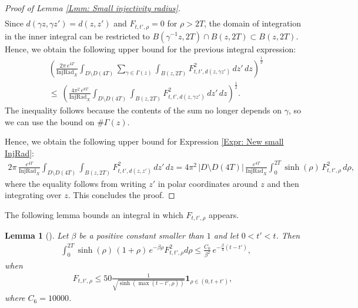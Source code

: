 \documentclass[11pt,twoside,reqno]{amsart} \usepackage{a4wide} \usepackage[T1]{fontenc} \usepackage[utf8]{inputenc} \usepackage{soul}  \usepackage{amsmath} \usepackage{amsfonts} \usepackage{amssymb} \usepackage{mathtools} \usepackage{amsthm} \usepackage{xcolor} \usepackage{graphicx} \usepackage{hyperref} \usepackage{standalone} \usepackage{esint} \usepackage{comment} \usepackage[left=2.3cm,top=3cm,right=2.3cm]{geometry} \usepackage{bm} \usepackage{svg} \usepackage{float} \numberwithin{equation}{section} \theoremstyle{plain} \newtheorem{thm}{Theorem}[section] \newtheorem{theorem}[thm]{Theorem} \newtheorem*{theorem*}{Theorem}\newtheorem{conj}[thm]{Conjecture} \newtheorem{lemma}[thm]{Lemma} \newtheorem{prop}[thm]{Proposition} \newtheorem{proposition}[thm]{Proposition} \newtheorem{cor}[thm]{Corollary} \newtheorem{question}[thm]{Question} \newtheorem{corollary}[thm]{Corollary} \newtheorem{assumption}[thm]{Assumption} \theoremstyle{definition} \newtheorem{defn}[thm]{Definition} \newtheorem{choice}[thm]{Choice} \newtheorem{definition}[thm]{Definition} \newtheorem{ex}[thm]{Example} \newtheorem{notation}[thm]{Notation} \newtheorem*{ack}{Acknowledgements} \theoremstyle{remark} \newtheorem{remark}[thm]{Remark} \newtheorem{bigremark}[thm]{Remark} \usepackage{xcolor} \newcommand{\red}[1]{ {\color{Red}#1} } \newcommand{\blue}[1]{ {\color{Blue}#1} } \author{Kai Hippi} \address{Aalto University, Espoo, Finland} \email{kai.hippi@aalto.fi}
\begin{document}
\begin{proof}[Proof of Lemma \ref{Lmm: Small injectivity radius}]
\begin{align*}
	\end{align*}
	Since \( d(\gamma z, \gamma z') = d(z, z') \) and \( F_{t,t',\rho} = 0 \) for \( \rho > 2T \), the domain of integration in the inner integral can be restricted to \( B(\gamma^{-1}z, 2T) \cap B(z, 2T) \subset B(z, 2T) \). Hence, we obtain the following upper bound for the previous integral expression:
	\begin{align*}
		&
\left( \frac{2\pi \, e^{4T}}{ \operatorname{InjRad}_{X} } \int_{D \setminus D(4T)} \sum_{\gamma \in \Gamma(z)} \int_{B(z,2T)} F_{t,t', d(z, \gamma z')}^{2} \, dz' \, dz \right)^{\frac{1}{2}}
\\
& \leq \ 
\left( \frac{4\pi^{2} \, e^{8T}}{ \operatorname{InjRad}_{X} } \int_{D \setminus D(4T)} \int_{B(z,2T)} F_{t,t', d(z, \gamma z')}^{2} \, dz' \, dz \right)^{\frac{1}{2}}.
\end{align*}
The inequality follows because the contents of the sum no longer depends on \(\gamma\), so we can use the bound on \(\#\Gamma(z)\).

Hence, we obtain the following upper bound for Expression \eqref{Expr: New small InjRad}:
\begin{align*}
2 \pi \, \frac{e^{4T}}{\operatorname{InjRad}_{X}} \int_{D \setminus D(4T)} \int_{B(z,2T)} F_{t,t',d(z,z')}^{2} \, dz' \, dz 
= 4 \pi^{2} \, |D \setminus D(4T)| \, \frac{e^{4T}}{\operatorname{InjRad}_{X}} \int_{0}^{2T} \sinh(\rho) \, F_{t,t',\rho}^{2} \, d\rho,
\end{align*}
where the equality follows from writing \( z' \) in polar coordinates around \( z \) and then integrating over \( z \). This concludes the proof.

\end{proof}

The following lemma bounds an integral in which $ F_{t,t',\rho} $ appears.

\begin{lemma}[]
	\label{Lmm: Weight integral}
	Let $ \beta $ be a positive constant smaller than $ 1 $ and let $ 0 < t' < t $. Then
	\begin{align*}
		&
		\int_{0}^{2T} \sinh( \rho ) \, ( 1 + \rho ) \, e^{ - \beta  \rho } F_{t,t',\rho}^{2} d \rho \leq \frac{C_{6}}{ \beta^{2} }  \, e^{ - \frac{\beta}{4}( t - t' ) },
	\end{align*}
	when
	\begin{align*}
		F_{t,t',\rho} \leq 50 \frac{1}{\sqrt{ \sinh( \max( t-t', \rho ) ) }} \boldsymbol 1_{ \rho \in ( 0, t + t' ) }, 
	\end{align*}
	where $C_{6} = 10000$.
\end{lemma}
\end{document}
